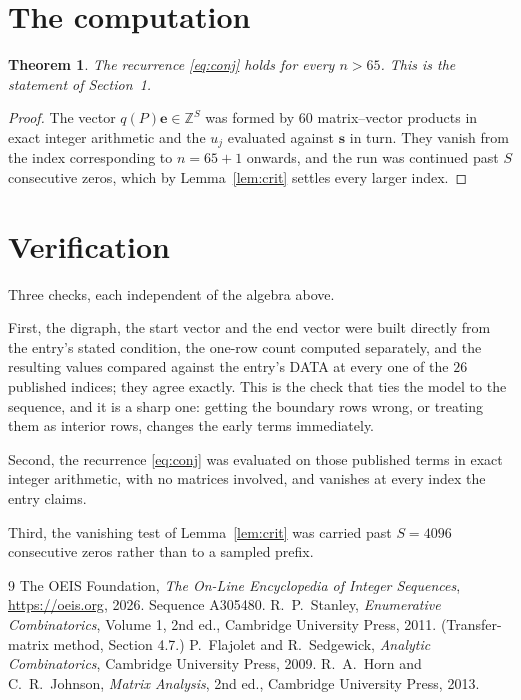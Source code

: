\documentclass[11pt,a4paper]{article}
\theoremstyle{plain}
\newtheorem{theorem}{Theorem}
\theoremstyle{definition}
\begin{document}
\section{The computation}

\begin{theorem}
The recurrence \eqref{eq:conj} holds for every $n>65$. This is the statement of
Section~1.
\end{theorem}

\begin{proof}
The vector $q(P)\mathbf{e}\in\mathbb{Z}^{S}$ was formed by $60$ matrix--vector
products in exact integer arithmetic and the $u_j$ evaluated against $\mathbf{s}$ in turn.
They vanish from the index corresponding to $n=65+1$ onwards, and the run was continued
past $S$ consecutive zeros, which by Lemma~\ref{lem:crit} settles every larger index.
\end{proof}

\section{Verification}

Three checks, each independent of the algebra above.

First, the digraph, the start vector and the end vector were built directly from the
entry's stated condition, the one-row count computed separately, and the resulting values
compared against the entry's DATA at every one of the $26$ published indices; they
agree exactly. This is the check that ties the model to the sequence, and it is a sharp one:
getting the boundary rows wrong, or treating them as interior rows, changes the early terms
immediately.

Second, the recurrence \eqref{eq:conj} was evaluated on those published terms in exact
integer arithmetic, with no matrices involved, and vanishes at every index the entry claims.

Third, the vanishing test of Lemma~\ref{lem:crit} was carried past $S=4096$ consecutive
zeros rather than to a sampled prefix.

\begin{thebibliography}{9}
 The OEIS Foundation, \emph{The On-Line Encyclopedia of Integer
Sequences}, \url{https://oeis.org}, 2026. Sequence A305480.
 R.~P.~Stanley, \emph{Enumerative Combinatorics}, Volume 1, 2nd ed.,
Cambridge University Press, 2011. (Transfer-matrix method, Section 4.7.)
 P.~Flajolet and R.~Sedgewick, \emph{Analytic Combinatorics}, Cambridge
University Press, 2009.
 R.~A.~Horn and C.~R.~Johnson, \emph{Matrix Analysis}, 2nd ed., Cambridge
University Press, 2013.
\end{thebibliography}
\end{document}
